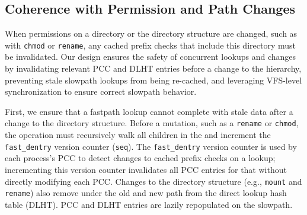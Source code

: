 




\subsection{Coherence with Permission and Path Changes}
\label{sec:dcache:rename}

When permissions on a directory or the directory structure are changed, such as with {\tt chmod} or {\tt rename},
any cached prefix checks that include this directory must be invalidated.
Our design  ensures the safety of concurrent lookups and changes by 
invalidating relevant PCC and DLHT entries before a change to the hierarchy,
preventing stale slowpath lookups from being re-cached, and leveraging VFS-level synchronization
to ensure correct slowpath behavior.
  
First, we ensure that a fastpath lookup cannot complete with stale data after a change to the directory structure.
Before a mutation, such as a {\tt rename} or {\tt chmod}, the operation 
must recursively walk all children in the \dcache{} 
and increment the {\tt fast\_dentry} version counter ({\tt seq}). %
The {\tt fast\_dentry} version counter is used by each process's PCC to detect changes to cached prefix checks on a lookup; %
incrementing this version counter invalidates all PCC entries for that \dentry{} without directly modifying
each PCC.  
Changes to the directory structure (e.g., {\tt mount} and {\tt rename}) 
also remove \dentries{} under the old and new path 
from the direct
lookup hash table (DLHT).
PCC and DLHT entries are lazily repopulated on the slowpath.

